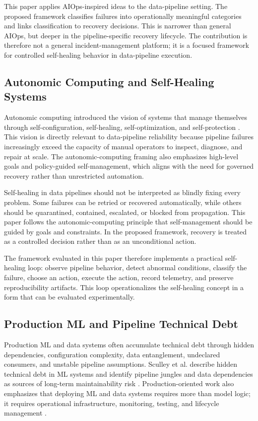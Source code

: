This paper applies AIOps-inspired ideas to the data-pipeline setting. The proposed framework classifies failures into operationally meaningful categories and links classification to recovery decisions. This is narrower than general AIOps, but deeper in the pipeline-specific recovery lifecycle. The contribution is therefore not a general incident-management platform; it is a focused framework for controlled self-healing behavior in data-pipeline execution.

\subsection{Autonomic Computing and Self-Healing Systems}

Autonomic computing introduced the vision of systems that manage themselves through self-configuration, self-healing, self-optimization, and self-protection \cite{kephart2003vision}. This vision is directly relevant to data-pipeline reliability because pipeline failures increasingly exceed the capacity of manual operators to inspect, diagnose, and repair at scale. The autonomic-computing framing also emphasizes high-level goals and policy-guided self-management, which aligns with the need for governed recovery rather than unrestricted automation.

Self-healing in data pipelines should not be interpreted as blindly fixing every problem. Some failures can be retried or recovered automatically, while others should be quarantined, contained, escalated, or blocked from propagation. This paper follows the autonomic-computing principle that self-management should be guided by goals and constraints. In the proposed framework, recovery is treated as a controlled decision rather than as an unconditional action.

The framework evaluated in this paper therefore implements a practical self-healing loop: observe pipeline behavior, detect abnormal conditions, classify the failure, choose an action, execute the action, record telemetry, and preserve reproducibility artifacts. This loop operationalizes the self-healing concept in a form that can be evaluated experimentally.

\subsection{Production ML and Pipeline Technical Debt}

Production ML and data systems often accumulate technical debt through hidden dependencies, configuration complexity, data entanglement, undeclared consumers, and unstable pipeline assumptions. Sculley et al. describe hidden technical debt in ML systems and identify pipeline jungles and data dependencies as sources of long-term maintainability risk \cite{sculley2015hidden}. Production-oriented work also emphasizes that deploying ML and data systems requires more than model logic; it requires operational infrastructure, monitoring, testing, and lifecycle management \cite{xin2021production}.

